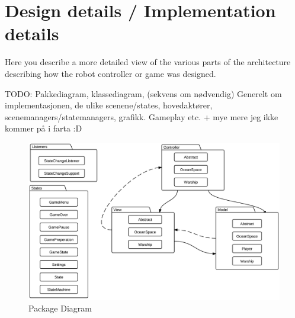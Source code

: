 \chapter{Design details / Implementation details}

Here you describe a more detailed view of the various parts of the 
architecture describing how the robot controller or game was designed.

TODO: Pakkediagram, klassediagram, (sekvens om nødvendig)
Generelt om implementasjonen, de ulike scenene/states, hovedaktører, scenemanagers/statemanagers, grafikk. Gameplay etc.  + mye mere jeg ikke kommer på i farta :D 


\begin{figure}[ht]
    \includegraphics[width=\textwidth]{img/PackageDiagram.png}
    \caption{Package Diagram}
    \label{fig:PackageDiagram}
\end{figure}

